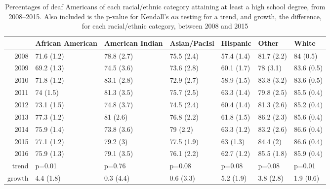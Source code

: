 \documentclass{article}\usepackage[]{graphicx}\usepackage[]{color}
\begin{document}
\begin{table}[ht]
\centering
\begin{tabular}{rllllll}
  \hline
 & African American & American Indian & Asian/PacIsl & Hispanic & Other & White \\
  \hline
2008 & 71.6 (1.2) & 78.8 (2.7) & 75.5 (2.4) & 57.4 (1.4) & 81.7 (2.2) & 84 (0.5) \\
  2009 & 69.2 (1.3) & 74.5 (3.6) & 73.6 (2.8) & 60.1 (1.7) & 78 (3.1) & 83.6 (0.5) \\
  2010 & 71.8 (1.2) & 83.1 (2.8) & 72.9 (2.7) & 58.9 (1.5) & 83.8 (3.2) & 83.6 (0.5) \\
  2011 & 74 (1.5) & 81.3 (3.5) & 75.7 (2.5) & 63.3 (1.4) & 79.8 (2.5) & 85.5 (0.4) \\
  2012 & 73.1 (1.5) & 74.8 (3.7) & 74.5 (2.4) & 60.4 (1.4) & 81.3 (2.6) & 85.2 (0.4) \\
  2013 & 77.3 (1.2) & 81 (2.6) & 76.8 (2.2) & 61.8 (1.5) & 86.2 (2.3) & 85.6 (0.4) \\
  2014 & 75.9 (1.4) & 73.8 (3.6) & 79 (2.2) & 63.3 (1.2) & 83.2 (2.6) & 86.6 (0.4) \\
  2015 & 77.1 (1.2) & 79.2 (3) & 77.5 (1.9) & 63 (1.3) & 84.4 (2) & 86.6 (0.4) \\
  2016 & 75.9 (1.3) & 79.1 (3.5) & 76.1 (2.2) & 62.7 (1.2) & 85.5 (1.8) & 85.9 (0.4) \\
  trend & p=0.01 & p=0.76 & p=0.08 & p=0.08 & p=0.08 & p=0.01 \\
  growth & 4.4 (1.8) & 0.3 (4.4) & 0.6 (3.3) & 5.2 (1.9) & 3.8 (2.8) & 1.9 (0.6) \\
   \hline
\end{tabular}
\caption{Percentages of deaf Americans of each racial/ethnic category attaining at least a high school degree, from 2008--2015. Also included is the p-value for Kendall's $	au$ testing for a trend, and growth, the difference, for each racial/ethnic category, between 2008 and 2015}
\end{table}
\end{document}
